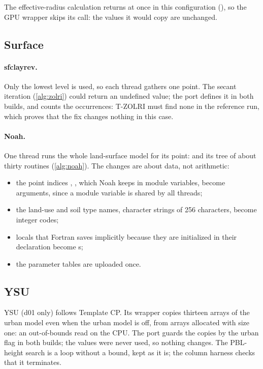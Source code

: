 The effective-radius calculation returns at once in this configuration (), so the GPU wrapper skips
its call: the values it would copy are unchanged.

\subsection{Surface}

\paragraph{sfclayrev.} Only the lowest level is used, so each thread gathers one point. The secant iteration
 (\cref{alg:zolri}) could return an undefined value; the port defines it in both builds, and counts the
occurrences: T-ZOLRI must find none in the reference run, which proves that the fix changes nothing in this case.

\paragraph{Noah.} One thread runs the whole land-surface model for its point:  and its tree of about thirty
routines (\cref{alg:noah}). The changes are about data, not arithmetic:
\begin{itemize}
  \item the point indices , , which Noah keeps in module variables, become arguments, since a
    module variable is shared by all threads;
  \item the land-use and soil type names, character strings of 256 characters, become integer codes;
  \item locals that Fortran saves implicitly because they are initialized in their declaration become
    s;
  \item the parameter tables are uploaded once.
\end{itemize}

\subsection{YSU}

YSU (d01 only) follows Template CP. Its wrapper copies thirteen arrays of the urban model even when the urban model is
off, from arrays allocated with size one: an out-of-bounds read on the CPU. The port guards the copies by the urban
flag in both builds; the values were never used, so nothing changes. The PBL-height search  is a
 loop without a bound, kept as it is; the column harness checks that it terminates.

